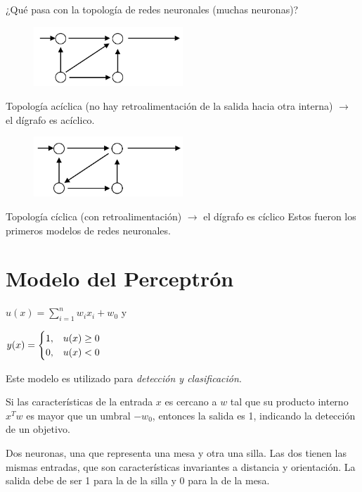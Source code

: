 ¿Qué pasa con la topología de redes neuronales (muchas neuronas)?

\begin{figure}[h!]
	\centering
	\includegraphics[width=0.5\textwidth]{images/img74.png}
	\label{figura74}
\end{figure}
\break

Topología acíclica (no hay retroalimentación de la salida hacia otra interna) $\rightarrow$ el dígrafo es acíclico.

\begin{figure}[h!]
	\centering
	\includegraphics[width=0.5\textwidth]{images/img75.png}
	\label{figura75}
\end{figure}


Topología cíclica (con retroalimentación) $\rightarrow$ el dígrafo es cíclico
Estos fueron los primeros modelos de redes neuronales.

\section{Modelo del Perceptrón}

$
u(x) = \sum_{i=1}^{n} w_i x_i + w_0 
$
y

$
y(x) = \begin{cases}
1, \hspace{0.3cm} u(x) \geq 0    \\
0,\hspace{0.3cm}   u(x) < 0  
\end{cases}
$

Este modelo es utilizado para \textit{detección y clasificación}.

Si las características de la entrada $x$ es cercano a $w$ tal que su producto interno $x^Tw$ es mayor que un
umbral $-w_0$, entonces la salida es 1, indicando la detección de un objetivo.


\begin{ejemplo}
	Dos neuronas, una que representa una mesa y otra una silla.
	Las dos tienen las mismas entradas, que son características invariantes a distancia y orientación. La salida
	debe de ser 1 para la de la silla y 0 para la de la mesa.
\end{ejemplo}

